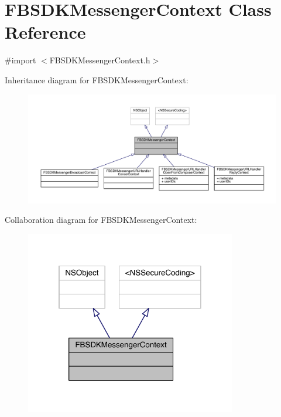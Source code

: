 \hypertarget{interface_f_b_s_d_k_messenger_context}{\section{F\-B\-S\-D\-K\-Messenger\-Context Class Reference}
\label{interface_f_b_s_d_k_messenger_context}
}


{\ttfamily \#import $<$F\-B\-S\-D\-K\-Messenger\-Context.\-h$>$}



Inheritance diagram for F\-B\-S\-D\-K\-Messenger\-Context\-:
\nopagebreak
\begin{figure}[H]
\begin{center}
\leavevmode
\includegraphics[width=350pt]{interface_f_b_s_d_k_messenger_context__inherit__graph}
\end{center}
\end{figure}


Collaboration diagram for F\-B\-S\-D\-K\-Messenger\-Context\-:
\nopagebreak
\begin{figure}[H]
\begin{center}
\leavevmode
\includegraphics[width=261pt]{interface_f_b_s_d_k_messenger_context__coll__graph}
\end{center}
\end{figure}


